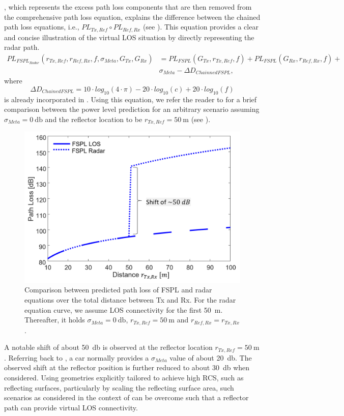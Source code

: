 , which represents the excess path loss components that are then removed from the comprehensive path loss equation, explains the difference between the chained path loss equations, i.e., $PL_{Tx,Ref} \circ  PL_{Ref,Rx}$ (see ).  This equation provides a clear and concise illustration of the virtual LOS situation by directly representing the radar path.
\begin{equation}\label{FSPLChained}
	\begin{aligned}
		PL_{FSPL_{Radar}}(r_{Tx,Ref},r_{Ref,Rx},f,\sigma_{Meta},G_{Tx}, G_{Rx})&=PL_{FSPL}(G_{Tx}, r_{Tx,Ref},f)+PL_{FSPL}(G_{Rx}, r_{Ref,Rx},f)+\\ &\sigma_{Meta}-\Delta D_{ChainnedFSPL},
	\end{aligned}
\end{equation}
where
\begin{equation} \label{FSPL_delta}
	\Delta D_{ChainedFSPL}= 10\cdot log_{10}(4 \cdot \pi)- 20\cdot log_{10}(c)+20\cdot log_{10}(f)
\end{equation}
 is already incorporated in . Using this equation, we refer the reader to  for a brief comparison between the power level prediction for an arbitrary scenario assuming $\sigma_{Meta}=\SI{0}{\decibel}$ and the reflector location to be $r_{Tx, Ref}=\SI{50}{\meter}$ (see ).
\begin{figure}[H]
	\centering
	\includegraphics[width=0.75\linewidth]{images/Section 4 Images/FSPL_Radar}
	\caption{Comparison between predicted path loss of FSPL and radar equations over the total distance between Tx and Rx. For the radar equation curve, we assume LOS connectivity for the first \SI{50}{\meter}. Thereafter, it holds $\sigma_{Meta}=\SI{0}{\decibel}$, $r_{Tx, Ref}=\SI{50}{\meter}$ and $r_{Ref, Rx}=r_{Tx, Rx}$.}
	\label{fig:FSPL_Radar}
\end{figure}
A notable shift of about \SI{50}{\decibel} is observed at the reflector location $r_{Tx, Ref}=\SI{50}{\meter}$. Referring back to , a car normally provides a $\sigma_{Meta}$ value of about \SI{20}{\decibel}. The observed shift at the reflector position is further reduced to about \SI{30}{\decibel} when considered. Using geometries explicitly tailored to achieve high RCS, such as reflecting surfaces, particularly by scaling the reflecting surface area, such scenarios as considered in the context of  can be overcome such that a reflector path can provide virtual LOS connectivity. 
